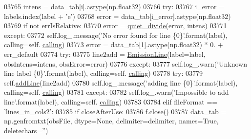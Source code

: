 \begin{DoxyCode}
03765                     intens = data\_tab[i].astype(np.float32)
03766                     \textcolor{keywordflow}{try}:
03767                         i\_error = labels.index(label + \textcolor{stringliteral}{'e'})
03768                         error = data\_tab[i\_error].astype(np.float32)
03769                         \textcolor{keywordflow}{if} \textcolor{keywordflow}{not} errIsRelative:
03770                             error = \hyperlink{namespacepyneb_1_1utils_1_1misc_a852d66d22ba9e872484b3346dc28249e}{quiet\_divide}(error, intens)
03771                     \textcolor{keywordflow}{except}:
03772                         self.log\_.message(\textcolor{stringliteral}{'No error found for line \{0\}'}.format(label), calling=self.
      \hyperlink{classpyneb_1_1core_1_1pynebcore_1_1_observation_a2639fad9af4fefad20e4097295bd40e7}{calling})
03773                         error = data\_tab[1].astype(np.float32) * 0. + err\_default
03774                     \textcolor{keywordflow}{try}:
03775                         line2add = \hyperlink{classpyneb_1_1core_1_1pynebcore_1_1_emission_line}{EmissionLine}(label=label, obsIntens=intens, obsError=error)
03776                     \textcolor{keywordflow}{except}:
03777                         self.log\_.warn(\textcolor{stringliteral}{'Unknown line label \{0\}'}.format(label), calling=self.
      \hyperlink{classpyneb_1_1core_1_1pynebcore_1_1_observation_a2639fad9af4fefad20e4097295bd40e7}{calling})
03778                     \textcolor{keywordflow}{try}:
03779                         self.\hyperlink{classpyneb_1_1core_1_1pynebcore_1_1_observation_a17ddf1c03fd1859cafe36d0593ec5f01}{addLine}(line2add)
03780                         self.log\_.message(\textcolor{stringliteral}{'adding line \{0\}'}.format(label), calling=self.
      \hyperlink{classpyneb_1_1core_1_1pynebcore_1_1_observation_a2639fad9af4fefad20e4097295bd40e7}{calling})
03781                     \textcolor{keywordflow}{except}:
03782                         self.log\_.warn(\textcolor{stringliteral}{'Impossible to add line'}.format(label), calling=self.
      \hyperlink{classpyneb_1_1core_1_1pynebcore_1_1_observation_a2639fad9af4fefad20e4097295bd40e7}{calling})
03783                         
03784         \textcolor{keywordflow}{elif} fileFormat == \textcolor{stringliteral}{'lines\_in\_cols2'}:
03785             \textcolor{keywordflow}{if} closeAfterUse:
03786                 f.close()
03787             data\_tab = np.genfromtxt(obsFile, dtype=\textcolor{keywordtype}{None}, delimiter=delimiter, names=\textcolor{keyword}{True}, deletechars=\textcolor{stringliteral}{''})

\end{DoxyCode}
